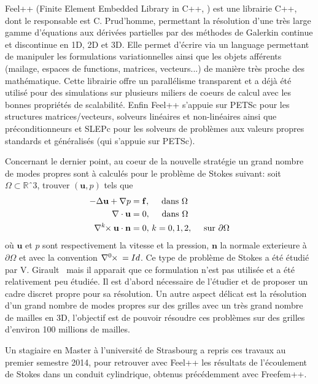 \documentclass[12pt]{article}
\newcommand{\curlk}[1][k]{\ensuremath{\nabla^{#1}\hspace{-.3em}\times}\xspace}
\begin{document}
Feel++ (Finite Element Embedded Library in C++,
\cite{PRUDHOMME:2012:HAL-00662868:3,feelpp098:10046} ) est une librairie C++,
dont le responsable est C. Prud'homme, permettant la résolution d'une très large
gamme d'équations aux dérivées partielles par des méthodes de Galerkin continue
et discontinue en 1D, 2D et 3D. Elle permet d'écrire via un language permettant
de manipuler les formulations variationnelles ainsi que les objets afférents
(mailage, espaces de functions, matrices, vecteurs...) de manière très proche
des mathématique. Cette librairie offre un parallélisme transparent et a déjà
été utilisé pour des simulations sur plusieurs miliers de coeurs de calcul avec
les bonnes propriétés de scalabilité. Enfin Feel++ s'appuie sur PETSc pour les
structures matrices/vecteurs, solveurs linéaires et non-linéaires ainsi que
préconditionneurs et SLEPc pour les solveurs de problèmes aux valeurs propres
standards et généralisés (qui s'appuie sur PETSc).

Concernant le dernier point, au coeur de la nouvelle stratégie un grand nombre
de modes propres sont à calculés pour le problème de Stokes suivant: soit
$\Omega \subset \mathbb{R}ˆ3$, trouver $(\mathbf{u},p)$ tels que
\begin{align}
  \label{eq:1}
  -\Delta \mathbf{u} + \nabla p &= \mathbf{f},\quad \mbox{ dans } \Omega\\
  \nabla \cdot \mathbf{u} &= 0,\quad \mbox{ dans } \Omega\\
  \curlk{} \mathbf{u} \cdot \mathbf{n} &= 0,\, k=0,1,2,\quad \mbox{ sur
  } \partial \Omega
\end{align}
où $\mathbf{u}$ et $p$ sont respectivement la vitesse et la pression,
$\mathbf{n}$ la normale exterieure à $\partial \Omega$ et avec la convention
$\curlk[0]{} = Id$. Ce type de problème de Stokes a été étudié par
V. Girault~\cite{girault90-1} mais il apparait que ce formulation n'est pas
utilisée et a été relativement peu étudiée. Il est d'abord nécessaire de
l'étudier et de proposer un cadre discret propre pour sa résolution. Un autre
aspect délicat est la résolution d'un grand nombre de modes propres sur des
grilles avec un très grand nombre de mailles en 3D, l'objectif est de pouvoir
résoudre ces problèmes sur des grilles d'environ  100 millions de mailles.

Un stagiaire en Master à l’université de Strasbourg a  repris ces travaux au
premier semestre 2014, pour retrouver avec Feel++ les résultats de l’écoulement
de Stokes dans un conduit cylindrique, obtenus précédemment avec Freefem++.
\end{document}
